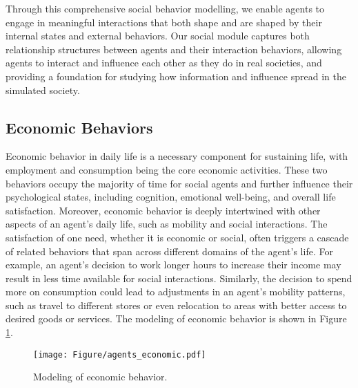 Through this comprehensive social behavior modelling, we enable agents to engage in meaningful interactions that both shape and are shaped by their internal states and external behaviors. Our social module captures both relationship structures between agents and their interaction behaviors, allowing agents to interact and influence each other as they do in real societies, and providing a foundation for studying how information and influence spread in the simulated society.



\subsection{Economic Behaviors} \label{sec:economy}
Economic behavior in daily life is a necessary component for sustaining life, with employment and consumption being the core economic activities. These two behaviors occupy the majority of time for social agents and further influence their psychological states, including cognition, emotional well-being, and overall life satisfaction. Moreover, economic behavior is deeply intertwined with other aspects of an agent's daily life, such as mobility and social interactions. The satisfaction of one need, whether it is economic or social, often triggers a cascade of related behaviors that span across different domains of the agent’s life. For example, an agent’s decision to work longer hours to increase their income may result in less time available for social interactions. Similarly, the decision to spend more on consumption could lead to adjustments in an agent’s mobility patterns, such as travel to different stores or even relocation to areas with better access to desired goods or services. The modeling of economic behavior is shown in Figure \ref{fig:agents_economic}.

\begin{figure}[ht]
\centering
\texttt{[image: Figure/agents\_economic.pdf]}
\caption{Modeling of economic behavior.}
\label{fig:agents_economic}
\end{figure}

